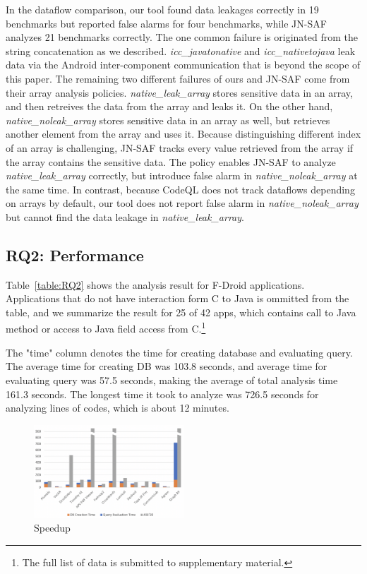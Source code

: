 In the dataflow comparison, our tool found data leakages correctly in 19
benchmarks but reported false alarms for four benchmarks, while JN-SAF analyzes
21 benchmarks correctly. The one common failure is originated from the string
concatenation as we described. {\it icc\_javatonative} and {\it
icc\_nativetojava} leak data via the Android inter-component communication that
is beyond the scope of this paper. The remaining two different failures of ours
and JN-SAF come from their array analysis policies. {\it native\_leak\_array}
stores sensitive data in an array, and then retreives the data from the array
and leaks it. On the other hand, {\it native\_noleak\_array} stores sensitive
data in an array as well, but retrieves another element from the array and uses
it. Because distinguishing different index of an array is challenging, JN-SAF
tracks every value retrieved from the array if the array contains the sensitive
data. The policy enables JN-SAF to analyze {\it native\_leak\_array} correctly,
but introduce false alarm in {\it native\_noleak\_array} at the same time. In
contrast, because CodeQL does not track dataflows depending on arrays by
default, our tool does not report false alarm in {\it native\_noleak\_array}
but cannot find the data leakage in {\it native\_leak\_array}.


\subsection{RQ2: Performance}

Table~\ref{table:RQ2} shows the analysis result for F-Droid applications.
Applications that do not have interaction form C to Java is ommitted from the
table, and we summarize the result for 25 of 42 apps, which contains call to
Java method or access to Java field access from C.\footnote{The full list of data
is submitted to supplementary material.}

The "time" column denotes the time for creating database and evaluating query.
The average time for creating DB was 103.8 seconds, and average time for
evaluating query was 57.5 seconds, making the average of total analysis time
161.3 seconds. The longest time it took to analyze was 726.5 seconds for
analyzing  lines of codes, which is about 12 minutes.

\begin{figure}[t]
  \centering
  \vspace{2mm}
  \includegraphics[width=0.5\textwidth]{img/graph}
  \vspace*{-1.5em}
  \caption{Speedup}
  \label{fig:graph}
\vspace*{-.5em}
\end{figure}

